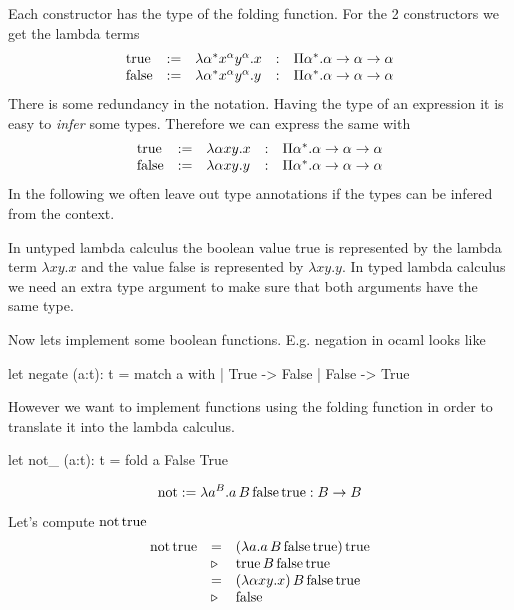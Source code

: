 Each constructor has the type of the folding function. For the 2 constructors
we get the lambda terms
%
$$
\begin{array}{lllll}
  \text{true}
  &:=& \lambda \alpha^* x^\alpha y^\alpha . x
  &:& \Pi \alpha^*. \alpha \to \alpha \to \alpha
  \\
  \text{false}
  &:=& \lambda \alpha^* x^\alpha y^\alpha . y
  &:& \Pi \alpha^*. \alpha \to \alpha \to \alpha
\end{array}
$$
%
There is some redundancy in the notation. Having the type of an expression it
is easy to \emph{infer} some types. Therefore we can express the same with
%
$$
\begin{array}{lllll}
  \text{true}
  &:=& \lambda \alpha x y . x
  &:& \Pi \alpha^*. \alpha \to \alpha \to \alpha
  \\
  \text{false}
  &:=& \lambda \alpha x y . y
  &:& \Pi \alpha^*. \alpha \to \alpha \to \alpha
\end{array}
$$
%
In the following we often leave out type annotations if the types can be
infered from the context.


In untyped lambda calculus the boolean value true is represented by the lambda
term $\lambda x y. x$ and the value false is represented by $\lambda x y
.y$. In typed lambda calculus we need an extra type argument to make sure that
both arguments have the same type.


Now lets implement some boolean functions. E.g. negation in ocaml looks like
\begin{ocaml}
  let negate (a:t): t =
     match a with
     | True  -> False
     | False -> True
\end{ocaml}
%
However we want to implement functions using the folding function in order to
translate it into the lambda calculus.
%
\begin{ocaml}
  let not_ (a:t): t =
     fold a False True
\end{ocaml}

$$
\text{not}
:= \lambda a^B. a\, B\, \text{false}\, \text{true}
: B \to B
$$

Let's compute $\text{not} \, \text{true}$
$$
%
\begin{array}{lll}
    \text{not} \, \true
    &=&
    (\lambda a. a\, B\, \false\, \true)\, \true
    \\
    &\reduce& \true\, B\, \false\, \true
    \\
    &=& (\lambda \alpha x y. x)\, B\, \false\, \true
    \\
    &\reduce& \false
\end{array}
$$


